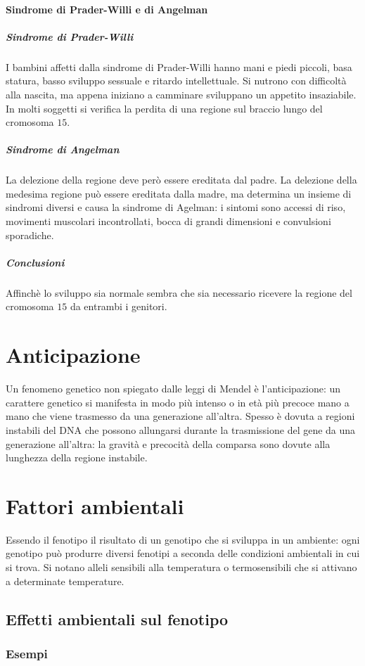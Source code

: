 \paragraph{Sindrome di Prader-Willi e di Angelman}
\subparagraph{Sindrome di Prader-Willi}
I bambini affetti dalla sindrome di Prader-Willi hanno mani e piedi piccoli, basa statura, basso sviluppo sessuale e ritardo intellettuale. Si nutrono con difficolt\`a alla nascita, ma appena iniziano a 
camminare sviluppano un appetito insaziabile. In molti soggetti si verifica la perdita di una regione sul braccio lungo del cromosoma $15$. 
\subparagraph{Sindrome di Angelman}
La delezione della regione deve per\`o essere ereditata dal
padre. La delezione della medesima regione pu\`o essere ereditata dalla madre, ma determina un insieme di sindromi diversi e causa la sindrome di Agelman: i sintomi sono accessi di riso, movimenti 
muscolari incontrollati, bocca di grandi dimensioni e convulsioni sporadiche.
\subparagraph{Conclusioni}
Affinch\`e lo sviluppo sia normale sembra che sia necessario ricevere la regione del cromosoma $15$ da entrambi i genitori.
\section{Anticipazione}
Un fenomeno genetico non spiegato dalle leggi di Mendel \`e l'anticipazione: un carattere genetico si manifesta in modo pi\`u intenso o in et\`a pi\`u precoce mano a mano che viene trasmesso da una 
generazione all'altra. Spesso \`e dovuta a regioni instabili del DNA che possono allungarsi durante la trasmissione del gene da una generazione all'altra: la gravit\`a e precocit\`a della comparsa
sono dovute alla lunghezza della regione instabile. 
\section{Fattori ambientali}
Essendo il fenotipo il risultato di un genotipo che si sviluppa in un ambiente: ogni genotipo pu\`o produrre diversi fenotipi a seconda delle condizioni ambientali in cui si trova. Si notano alleli
sensibili alla temperatura o termosensibili che si attivano a determinate temperature. 
\subsection{Effetti ambientali sul fenotipo}
\subsubsection{Esempi}
